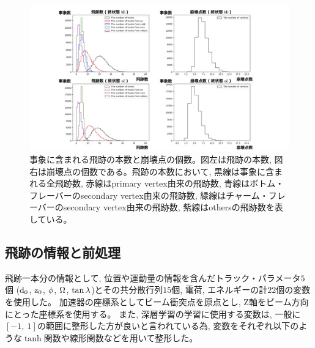 \begin{figure}[htbp]
 \centering
 \includegraphics[trim = 150 0 150 0, width=1.0\textwidth, clip]{Figure/3Networks/3-1-1-2TracksandVertices.png}
 \caption[事象に含まれる飛跡の本数と崩壊点の個数]{事象に含まれる飛跡の本数と崩壊点の個数。図左は飛跡の本数, 図右は崩壊点の個数である。飛跡の本数において, 黒線は事象に含まれる全飛跡数, 赤線はprimary vertex由来の飛跡数, 青線はボトム・フレーバーのsecondary vertex由来の飛跡数, 緑線はチャーム・フレーバーのsecondary vertex由来の飛跡数, 紫線はothersの飛跡数を表している。}
 \label{3-1-1-2TracksandVertices}
\end{figure}


\subsection{飛跡の情報と前処理} \label{Net:Data:TrackInformationandPreprocessing}

飛跡一本分の情報として, 位置や運動量の情報を含んだトラック・パラメータ$5$個 ($\rm d_0$, $\rm z_0$, $\rm \phi$, $\rm \Omega$, $\rm \tan{\lambda}$)\cite{TrackParametersLCIO}とその共分散行列$15$個, 電荷, エネルギーの計$22$個の変数を使用した。
加速器の座標系としてビーム衝突点を原点とし, Z軸をビーム方向にとった座標系を使用する。
また, 深層学習の学習に使用する変数は, 一般に$[-1,\ 1]$の範囲に整形した方が良いと言われている為, 変数をそれぞれ以下のような$\tanh$関数や線形関数などを用いて整形した。

